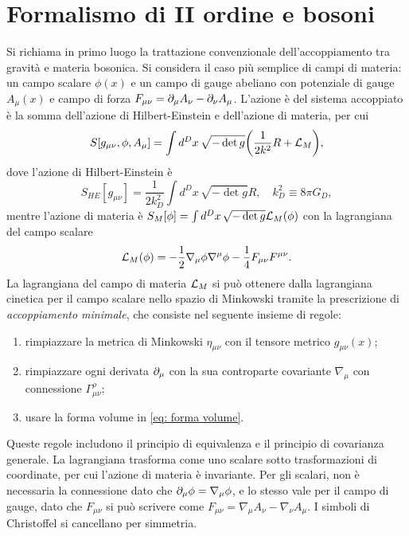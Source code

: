 \section{Formalismo di II ordine e bosoni}
Si richiama in primo luogo la trattazione convenzionale dell'accoppiamento tra gravità e materia bosonica. Si considera il caso più semplice di campi di materia: un campo scalare $\phi(x)$ e un campo di gauge abeliano con potenziale di gauge $A_\mu(x)$ e campo di forza $F_{\mu\nu} = \partial_\mu A_\nu - \partial_\nu A_\mu$. L'azione è del sistema accoppiato è la somma dell'azione di Hilbert-Einstein e dell'azione di materia, per cui 
\begin{equation}
\label{eq: azione HE + campo scalare}
    S[g_{\mu\nu},\phi,A_\mu] = \int d^Dx\,\sqrt{-\det{g}}\bigg(\frac{1}{2k^2}R + \mathcal{L}_M\bigg),
\end{equation}
dove l'azione di Hilbert-Einstein è 
\begin{equation}
    S_{HE}[g_{\mu\nu}] = \frac{1}{2k_D^2}\int d^Dx\,\sqrt{-\det{g}}R,\quad k_D^2 \equiv 8\pi G_D,
\end{equation}
mentre l'azione di materia è $S_M[\phi] = \int d^Dx\,\sqrt{-\det{g}}\mathcal{L}_M(\phi)$ con la lagrangiana del campo scalare 
\begin{equation}
    \mathcal{L}_M(\phi) = -\frac{1}{2}\nabla_\mu\phi\nabla^\mu\phi - \frac{1}{4}F_{\mu\nu}F^{\mu\nu}.
\end{equation}
La lagrangiana del campo di materia $\mathcal{L}_M$ si può ottenere dalla lagrangiana cinetica per il campo scalare nello spazio di Minkowski tramite la prescrizione di \emph{accoppiamento minimale}, che consiste nel seguente insieme di regole:
\begin{enumerate}
    \item rimpiazzare la metrica di Minkowski $\eta_{\mu\nu}$ con il tensore metrico $g_{\mu\nu}(x)$;
    \item rimpiazzare ogni derivata $\partial_\mu$ con la sua controparte covariante $\nabla_\mu$ con connessione $\Gamma^\rho_{\mu\nu}$;
    \item usare la forma volume in \eqref{eq: forma volume}.
\end{enumerate}
Queste regole includono il principio di equivalenza e il principio di covarianza generale. La lagrangiana trasforma come uno scalare sotto trasformazioni di coordinate, per cui l'azione di materia è invariante. Per gli scalari, non è necessaria la connessione dato che $\partial_\mu\phi = \nabla_\mu \phi$, e lo stesso vale per il campo di gauge, dato che $F_{\mu\nu}$ si può scrivere come $F_{\mu\nu} = \nabla_\mu A_\nu - \nabla_\nu A_\mu$. I simboli di Christoffel si cancellano per simmetria.

